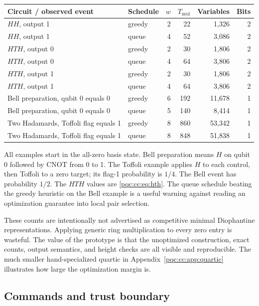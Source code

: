 \documentclass[11pt,letterpaper]{article}
\numberwithin{equation}{section}
\theoremstyle{definition}
\theoremstyle{remark}
\newcommand{\Tmul}{T_{\mathrm{mul}}}
\begin{document}
\begin{center}
\small
\begin{tabular}{@{}llrrrr@{}}
\toprule
Circuit / observed event & Schedule & $w$ & $\Tmul$ & Variables & Bits\\
\midrule
$HH$, output 1 & greedy & 2 & 22 & 1,326 & 2\\
$HH$, output 1 & queue  & 4 & 52 & 3,086 & 2\\
$HTH$, output 0 & greedy & 2 & 30 & 1,806 & 2\\
$HTH$, output 0 & queue  & 4 & 64 & 3,806 & 2\\
$HTH$, output 1 & greedy & 2 & 30 & 1,806 & 2\\
$HTH$, output 1 & queue  & 4 & 64 & 3,806 & 2\\
Bell preparation, qubit 0 equals 0 & greedy & 6 & 192 & 11,678 & 1\\
Bell preparation, qubit 0 equals 0 & queue  & 5 & 140 & 8,414 & 1\\
Two Hadamards, Toffoli flag equals 1 & greedy & 8 & 860 & 53,342 & 1\\
Two Hadamards, Toffoli flag equals 1 & queue  & 8 & 848 & 51,838 & 1\\
\bottomrule
\end{tabular}
\end{center}

All examples start in the all-zero basis state. Bell preparation means $H$ on
qubit 0 followed by CNOT from 0 to 1. The Toffoli example applies $H$ to each
control, then Toffoli to a zero target; its flag-1 probability is $1/4$.
The Bell event has probability $1/2$. The $HTH$ values are
\eqref{pqc:cc:eq:hth}. The queue schedule beating the greedy heuristic on the Bell
example is a useful warning against reading an optimization guarantee into
local pair selection.

These counts are intentionally not advertised as competitive minimal
Diophantine representations. Applying generic ring multiplication to every
zero entry is wasteful. The value of the prototype is that the unoptimized
construction, exact counts, output semantics, and height checks are all visible
and reproducible. The much smaller hand-specialized quartic in
Appendix~\ref{pqc:cc:app:quartic} illustrates how large the optimization margin is.

\subsection{Commands and trust boundary}
\end{document}
